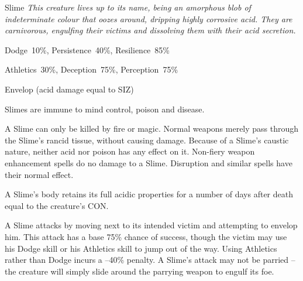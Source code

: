 \begin{monsterbox}{Slime}
	\textit{This creature lives up to its name, being an amorphous blob of indeterminate colour that oozes around, dripping highly corrosive acid. They are carnivorous, engulfing their victims and dissolving them with their acid secretion.}\\
	\rpghline
	\basics[%
        hitpoints  = 16,
	majorwound = 8,
	damagemodifier = 0,
	powerpoints = 11,
	movementrate = 7m (can crawl up walls and ceilings,
	armor = None,
	plunderrating = 1
	]
	\rpghline%
	\stats[ %
		STR = 1D6 (4),
		CON = 3D6 (11),
		DEX = 1D6 (4),
		SIZ = 6D6 (21),
		INT = 1   (1),
		POW = 3D6 (11),
		CHA = 1   (1)
	]
	\rpghline%
	\begin{rpg-monsteraction}[Resistances]
		Dodge~10\%, Persistence~40\%, Resilience~85\%
	\end{rpg-monsteraction}
	\begin{rpg-monsteraction}[Practical]
		Athletics~30\%, Deception~75\%, Perception~75\%
	\end{rpg-monsteraction}
	\begin{rpg-monsteraction}
		Envelop (acid damage equal to SIZ)
	\end{rpg-monsteraction}
	\begin{rpg-monsteraction}[Immunities]
		Slimes are immune to mind control, poison and disease.
	\end{rpg-monsteraction}
	\begin{rpg-monsteraction}
		A Slime can only be killed by fire or magic. Normal weapons merely pass through the Slime’s rancid tissue, without causing damage. Because of a Slime’s caustic nature, neither acid nor poison has any effect on it. Non-fiery weapon enhancement spells do no damage to a Slime. Disruption and similar spells have their normal effect.
	\end{rpg-monsteraction}
	\begin{rpg-monsteraction}
		A Slime’s body retains its full acidic properties for a number of days after death equal to the creature’s CON.
	\end{rpg-monsteraction}
	\begin{rpg-monsteraction}
		A Slime attacks by moving next to its intended victim and attempting to envelop him. This attack has a base 75\% chance of success, though the victim may use his Dodge skill or his Athletics skill to jump out of the way. Using Athletics rather than Dodge incurs a –40\% penalty. A Slime’s attack may not be parried – the creature will simply slide around the parrying weapon to engulf its foe.

\end{rpg-monsteraction}
\end{monsterbox}
